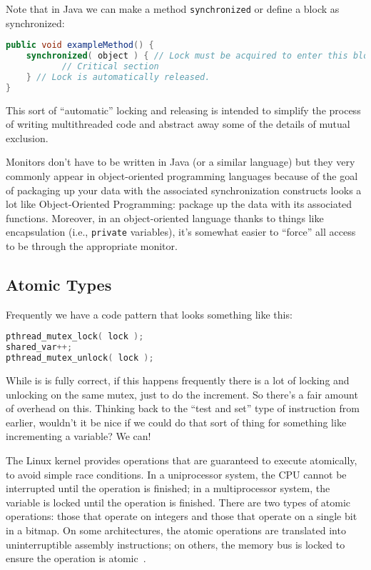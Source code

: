 Note that in Java we can make a method \texttt{synchronized} or define a block as synchronized:

\begin{lstlisting}[language=Java]
public void exampleMethod() {
    synchronized( object ) { // Lock must be acquired to enter this block
           // Critical section 
    } // Lock is automatically released.
}
\end{lstlisting}

This sort of ``automatic'' locking and releasing is intended to simplify the process of writing multithreaded code and abstract away some of the details of mutual exclusion.

Monitors don't have to be written in Java (or a similar language) but they very commonly appear in object-oriented programming languages because of the goal of packaging up your data with the associated synchronization constructs looks a lot like Object-Oriented Programming: package up the data with its associated functions. Moreover, in an object-oriented language thanks to things like encapsulation (i.e., \texttt{private} variables), it's somewhat easier to ``force'' all access to be through the appropriate monitor.

\subsection*{Atomic Types}

Frequently we have a code pattern that looks something like this:

\begin{lstlisting}[language=C]
pthread_mutex_lock( lock );
shared_var++;
pthread_mutex_unlock( lock );
\end{lstlisting}

While is is fully correct, if this happens frequently there is a lot of locking and unlocking on the same mutex, just to do the increment. So there's a fair amount of overhead on this. Thinking back to the ``test and set'' type of instruction from earlier, wouldn't it be nice if we could do that sort of thing for something like incrementing a variable? We can! 

The Linux kernel provides operations that are guaranteed to execute atomically, to avoid simple race conditions. In a uniprocessor system, the CPU cannot be interrupted until the operation is finished; in a multiprocessor system, the variable is locked until the operation is finished. There are two types of atomic operations: those that operate on integers and those that operate on a single bit in a bitmap. On some architectures, the atomic operations are translated into uninterruptible assembly instructions; on others, the memory bus is locked to ensure the operation is atomic~\cite{osi}.

